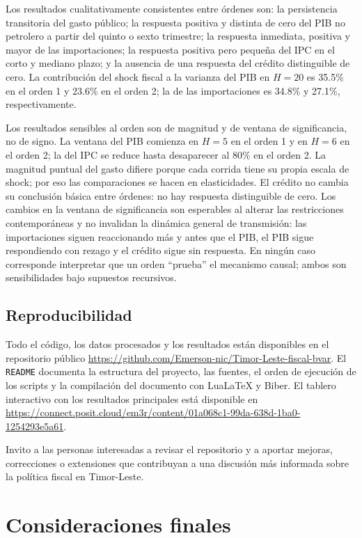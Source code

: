 \documentclass[11pt,a4paper]{article}
\begin{document}
Los resultados cualitativamente consistentes entre órdenes son: la
persistencia transitoria del gasto público; la respuesta positiva y distinta de
cero del PIB no petrolero a partir del quinto o sexto trimestre; la respuesta
inmediata, positiva y mayor de las importaciones; la respuesta positiva pero
pequeña del IPC en el corto y mediano plazo; y la ausencia de una respuesta del
crédito distinguible de cero. La contribución del shock fiscal a la varianza del
PIB en $H{=}20$ es 35.5\% en el orden 1 y 23.6\% en el orden 2; la de las
importaciones es 34.8\% y 27.1\%, respectivamente.

Los resultados sensibles al orden son de magnitud y de ventana de significancia,
no de signo. La ventana del PIB comienza en $H{=}5$ en el orden 1 y en $H{=}6$
en el orden 2; la del IPC se reduce hasta desaparecer al 80\% en el orden 2. La
magnitud puntual del gasto difiere porque cada corrida tiene su propia escala de
shock; por eso las comparaciones se hacen en elasticidades. El crédito no cambia
su conclusión básica entre órdenes: no hay respuesta distinguible de cero. Los
cambios en la ventana de significancia son esperables al alterar las restricciones
contemporáneas y no invalidan la dinámica general de transmisión: las
importaciones siguen reaccionando más y antes que el PIB, el PIB sigue
respondiendo con rezago y el crédito sigue sin respuesta. En ningún caso
corresponde interpretar que un orden ``prueba'' el mecanismo causal; ambos son
sensibilidades bajo supuestos recursivos.


\subsection{Reproducibilidad}
\label{sec:repro}

Todo el código, los datos procesados y los resultados están disponibles en el
repositorio público
\url{https://github.com/Emerson-nic/Timor-Leste-fiscal-bvar}. El
\texttt{README} documenta la estructura del proyecto, las fuentes, el orden de
ejecución de los scripts y la compilación del documento con LuaLaTeX y Biber.
El tablero interactivo con los resultados principales está disponible en
\url{https://connect.posit.cloud/em3r/content/01a068c1-99da-638d-1ba0-1254293e5a61}.

Invito a las personas interesadas a revisar el repositorio y a aportar mejoras,
correcciones o extensiones que contribuyan a una discusión más informada sobre
la política fiscal en Timor-Leste.

\section{Consideraciones finales}
\label{sec:final}
\end{document}

